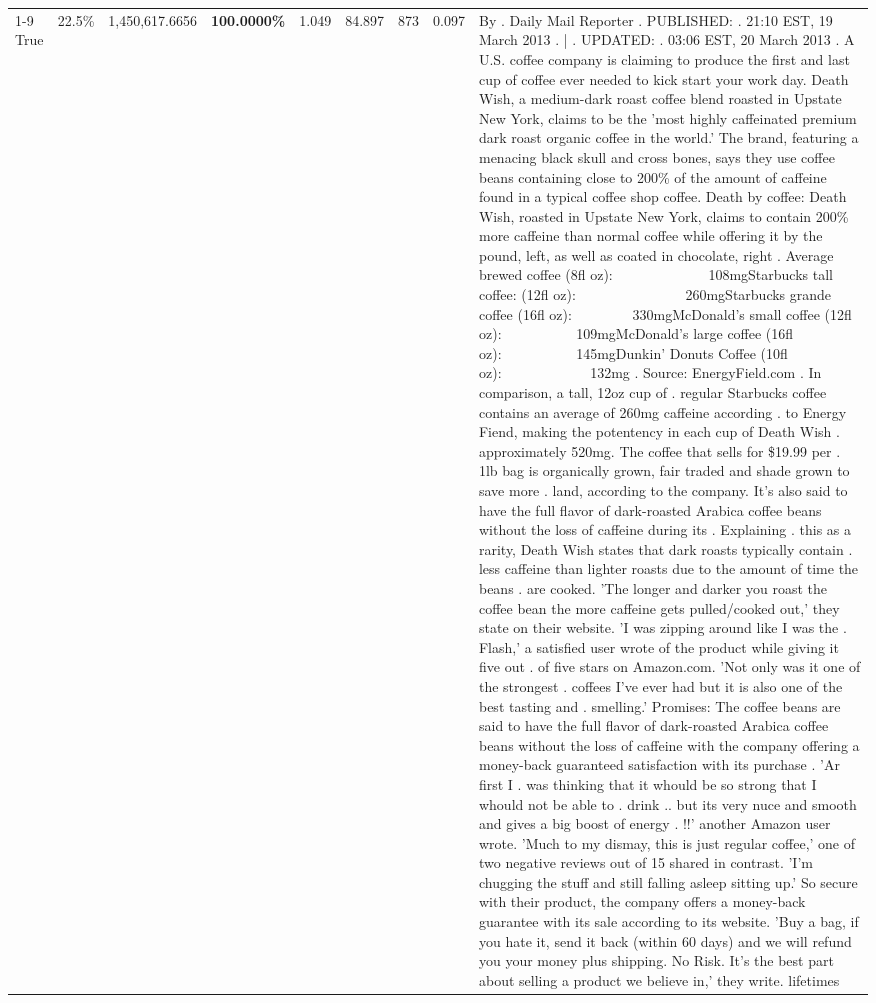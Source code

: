 \begin{table}[H]
{\begin{tabular}{lllrlllll}
\cline{1-9} \cline{2-9}
True & 22.5\% & 1,450,617.6656 & \bfseries \color{red} 100.0000\% & 1.049 & 84.897 & 873 & 0.097 & By . Daily Mail Reporter . PUBLISHED: . 21:10 EST, 19 March 2013 . | . UPDATED: . 03:06 EST, 20 March 2013 . A U.S. coffee company is claiming to produce the first and last cup of coffee ever needed to kick start your work day. Death Wish, a medium-dark roast coffee blend roasted in Upstate New York, claims to be the 'most highly caffeinated premium dark roast organic coffee in the world.' The brand, featuring a menacing black skull and cross bones, says they use coffee beans containing close to 200\% of the amount of caffeine found in a typical coffee shop coffee. Death by coffee: Death Wish, roasted in Upstate New York, claims to contain 200\% more caffeine than normal coffee while offering it by the pound, left, as well as coated in chocolate, right . Average brewed coffee (8fl oz):              108mgStarbucks tall coffee: (12fl oz):                260mgStarbucks grande coffee (16fl oz):         330mgMcDonald's small coffee (12fl oz):           109mgMcDonald's large coffee (16fl oz):           145mgDunkin' Donuts Coffee (10fl oz):             132mg . Source: EnergyField.com . In comparison, a tall, 12oz cup of . regular Starbucks coffee contains an average of 260mg caffeine according . to Energy Fiend, making the potentency in each cup of Death Wish . approximately 520mg. The coffee that sells for \$19.99 per . 1lb bag is organically grown, fair traded and shade grown to save more . land, according to the company. It's also said to have the full flavor of dark-roasted Arabica coffee beans without the loss of caffeine during its . Explaining . this as a rarity, Death Wish states that dark roasts typically contain . less caffeine than lighter roasts due to the amount of time the beans . are cooked. 'The longer and darker you roast the coffee bean the more caffeine gets pulled/cooked out,' they state on their website. 'I was zipping around like I was the . Flash,' a satisfied user wrote of the product while giving it five out . of five stars on Amazon.com. 'Not only was it one of the strongest . coffees I've ever had but it is also one of the best tasting and . smelling.’ Promises: The coffee beans are said to have the full flavor of dark-roasted Arabica coffee beans without the loss of caffeine with the company offering a money-back guaranteed satisfaction with its purchase . 'Ar first I . was thinking that it whould be so strong that I whould not be able to . drink .. but its very nuce and smooth and gives a big boost of energy . !!' another Amazon user wrote. 'Much to my dismay, this is just regular coffee,' one of two negative reviews out of 15 shared in contrast. 'I'm chugging the stuff and still falling asleep sitting up.' So secure with their product, the company offers a money-back guarantee with its sale according to its website. 'Buy a bag, if you hate it, send it back (within 60 days) and we will refund you your money plus shipping. No Risk. It’s the best part about selling a product we believe in,' they write. lifetimes \\

\end{tabular}}
\end{table}
